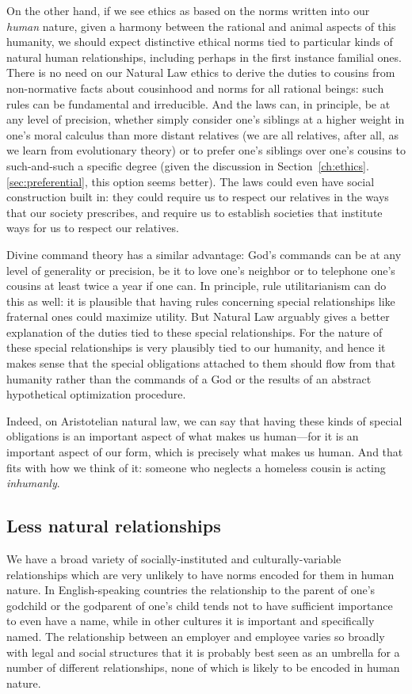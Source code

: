 On the other hand, if we see ethics as based on the norms written into our \textit{human} nature, given a harmony between the rational and animal aspects of this humanity,
we should expect distinctive ethical norms tied to particular kinds of natural human relationships, including perhaps in the first instance familial ones.
There is no need on our Natural Law ethics to derive the duties to cousins from non-normative facts about cousinhood and norms for all rational beings: such rules
can be fundamental and irreducible. And the laws can, in principle, be at any level of precision, whether simply consider one's siblings at a higher weight in one's moral calculus
than more distant relatives (we are all relatives, after all, as we learn from evolutionary theory) or to prefer one's siblings over one's cousins to such-and-such
a specific degree (given the discussion in Section~\ref{ch:ethics}.\ref{sec:preferential}, this option seems better). The laws could even have social construction built in: they could require us to respect our relatives in the ways that our society prescribes,
and require us to establish societies that institute ways for us to respect our relatives.

Divine command theory has a similar advantage: God's commands can be at any level of generality or precision, be it to love one's neighbor or to telephone one's cousins
at least twice a year if one can. In principle, rule utilitarianism can do this as well: it is plausible that having rules concerning special relationships like
fraternal ones could maximize utility. But Natural Law arguably gives a better explanation of the duties tied to these special relationships. For the nature of these
special relationships is very plausibly tied to our humanity, and hence it makes sense that the special obligations attached to them should flow from that humanity
rather than the commands of a God or the results of an abstract hypothetical optimization procedure.

Indeed, on Aristotelian natural law, we can say that having these kinds of special obligations is an important aspect of what makes us human---for it is an important
aspect of our form, which is precisely what makes us human. And that fits with how we think of it: someone who neglects
a homeless cousin is acting \textit{inhumanly}.

\subsection{Less natural relationships}
We have a broad variety of socially-instituted and culturally-variable relationships which are very unlikely to have norms encoded
for them in human nature.  In English-speaking countries the relationship to the  parent of one's godchild or the godparent of one's child
tends not to have sufficient importance to even have a name, while in other cultures it is important and specifically named. The relationship
between an employer and employee varies so broadly with legal and social structures that it is probably best seen as an umbrella for a number
of different relationships, none of which is likely to be encoded in human nature.

